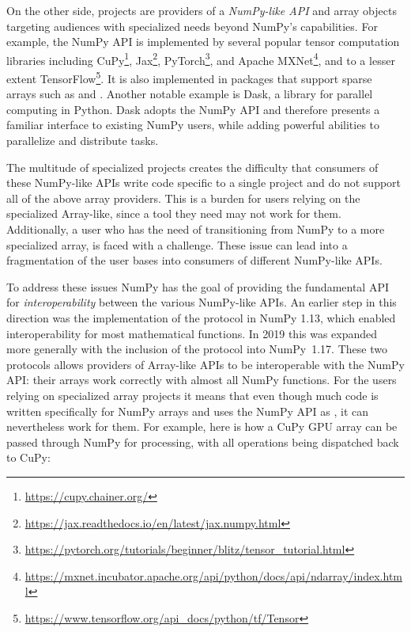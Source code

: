 On the other side, projects are providers of a \emph{NumPy-like API} and array
objects targeting audiences with specialized needs beyond NumPy's capabilities.
For example, the NumPy API is implemented by
several popular tensor computation libraries including
CuPy\footnote{\url{https://cupy.chainer.org/}},
Jax\footnote{\url{https://jax.readthedocs.io/en/latest/jax.numpy.html}},
PyTorch\footnote{\url{https://pytorch.org/tutorials/beginner/blitz/tensor\_tutorial.html}}, and
Apache MXNet\footnote{\url{https://mxnet.incubator.apache.org/api/python/docs/api/ndarray/index.html}},
and to a lesser extent
TensorFlow\footnote{\url{https://www.tensorflow.org/api\_docs/python/tf/Tensor}}.
It is also implemented in packages that support sparse arrays
such as  and .
Another notable example is Dask, a library for parallel computing in
Python.  Dask adopts the NumPy API and therefore presents a familiar
interface to existing NumPy users, while adding powerful abilities to
parallelize and distribute tasks.

The multitude of specialized projects creates the difficulty that consumers
of these NumPy-like APIs write code specific to a single project and do not support
all of the above array providers.
This is a burden for users relying on the specialized Array-like, since
a tool they need may not work for them.
Additionally, a user who has the need of transitioning from NumPy to a more
specialized array, is faced with a challenge.
These issue can lead into a fragmentation of the user bases into consumers
of different NumPy-like APIs.

To address these issues NumPy has the goal of providing the fundamental
API for \emph{interoperability} between the various NumPy-like APIs.
An earlier step in this direction was the implementation of the
 protocol in NumPy 1.13, which enabled interoperability
for most mathematical functions.\cite{NEP13}
In 2019 this was expanded more generally with the inclusion of the
 protocol into NumPy~1.17.
These two protocols allows providers of Array-like APIs to be interoperable
with the NumPy API: their arrays work correctly with almost all NumPy functions.\cite{NEP18}
For the users relying on specialized array projects it means that even though
much code is written specifically for NumPy arrays and uses the NumPy API as
, it can nevertheless work for them.  For
example, here is how a CuPy GPU array can be passed through NumPy for
processing, with all operations being dispatched back to CuPy:

